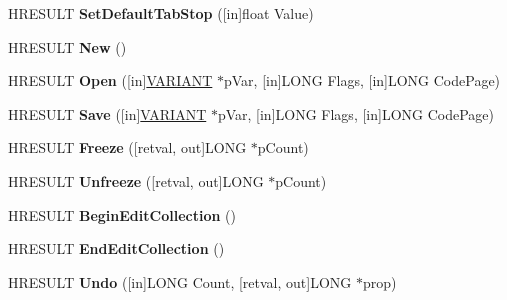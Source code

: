 \begin{DoxyCompactItemize}
H\+R\+E\+S\+U\+LT {\bfseries Set\+Default\+Tab\+Stop} (\mbox{[}in\mbox{]}float Value)
\item 
\mbox{\label{interface_i_text_document_a66fc86a9a535ec7a7b26b3e922bd5316}} 
H\+R\+E\+S\+U\+LT {\bfseries New} ()
\item 
\mbox{\label{interface_i_text_document_a0ffcfde403ff8bc146aa4addcb9011f6}} 
H\+R\+E\+S\+U\+LT {\bfseries Open} (\mbox{[}in\mbox{]}\hyperlink{structtag_v_a_r_i_a_n_t}{V\+A\+R\+I\+A\+NT} $\ast$p\+Var, \mbox{[}in\mbox{]}L\+O\+NG Flags, \mbox{[}in\mbox{]}L\+O\+NG Code\+Page)
\item 
\mbox{\label{interface_i_text_document_adb472ad6cd427fa15bae103e6ae7295b}} 
H\+R\+E\+S\+U\+LT {\bfseries Save} (\mbox{[}in\mbox{]}\hyperlink{structtag_v_a_r_i_a_n_t}{V\+A\+R\+I\+A\+NT} $\ast$p\+Var, \mbox{[}in\mbox{]}L\+O\+NG Flags, \mbox{[}in\mbox{]}L\+O\+NG Code\+Page)
\item 
\mbox{\label{interface_i_text_document_a502d12310bea651b3bcb55f719756521}} 
H\+R\+E\+S\+U\+LT {\bfseries Freeze} (\mbox{[}retval, out\mbox{]}L\+O\+NG $\ast$p\+Count)
\item 
\mbox{\label{interface_i_text_document_a0d0490eb51c618cff2e1587e6afad827}} 
H\+R\+E\+S\+U\+LT {\bfseries Unfreeze} (\mbox{[}retval, out\mbox{]}L\+O\+NG $\ast$p\+Count)
\item 
\mbox{\label{interface_i_text_document_a4d6124b266466eac4d708d8c71471500}} 
H\+R\+E\+S\+U\+LT {\bfseries Begin\+Edit\+Collection} ()
\item 
\mbox{\label{interface_i_text_document_aea3f9989c9b2ef707d16772ce704e6e4}} 
H\+R\+E\+S\+U\+LT {\bfseries End\+Edit\+Collection} ()
\item 
\mbox{\label{interface_i_text_document_aa340911437b5f11d7be04f2afa1039d4}} 
H\+R\+E\+S\+U\+LT {\bfseries Undo} (\mbox{[}in\mbox{]}L\+O\+NG Count, \mbox{[}retval, out\mbox{]}L\+O\+NG $\ast$prop)
\item 
\mbox{\label{interface_i_text_document_a481aea8f2185ede9949de7e62b2fcb51}} 

\end{DoxyCompactItemize}

